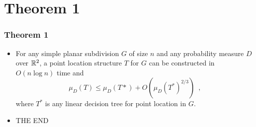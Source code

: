 \documentclass{beamer}
\begin{document}
\section{Theorem 1}
\frame
{
	\frametitle{Theorem 1}
	\begin{itemize}
	\item<1-> For any simple planar subdivision $G$ of size $n$ and
any probability measure $D$ over $\mathbb{R}^2$, a point location structure
$T$ for $G$ can be
constructed in $O(n\log n)$ time and
\[
	\mu_D(T) \le \mu_D(T*) + O(\mu_D(T^*)^{2/3}) \enspace ,
\]
where $T^*$ is any linear decision tree for point location in $G$.
         \item<2->[ ] \begin{center}\Huge THE END\end{center}
         \end{itemize}
}
\end{document}
